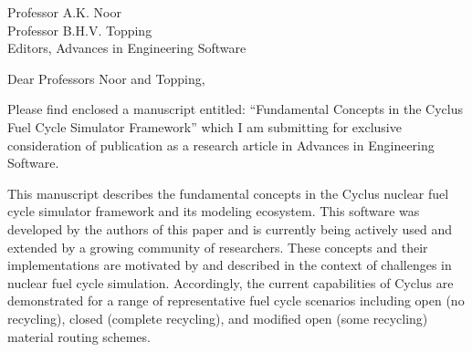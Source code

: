 \documentclass[11pt]{letter} %
\begin{document}


\begin{letter}{Professor A.K. Noor\\
Professor B.H.V. Topping\\
Editors, Advances in Engineering Software}

\address{Kathryn D. Huff\\
2150 Shattuck Ave.\\
Suite 230\\
Berkeley, CA 94720}



\opening{Dear Professors Noor and Topping,}

Please find enclosed a manuscript entitled: ``Fundamental Concepts in the 
Cyclus Fuel Cycle Simulator Framework'' which I am submitting for exclusive 
consideration of publication as a research article in Advances in Engineering 
Software.

This manuscript describes the fundamental concepts in the Cyclus nuclear fuel 
cycle simulator framework and its modeling ecosystem. This software was 
developed by the authors of this paper and is currently being actively used and 
extended by a growing community of researchers.  These concepts and their implementations 
are motivated by and described in the context of challenges in nuclear fuel 
cycle simulation.  Accordingly, the current capabilities of Cyclus are 
demonstrated for a range of representative fuel cycle scenarios including open 
(no recycling), closed (complete recycling), and modified open (some recycling) 
material routing schemes.



\end{letter}
\end{document}
